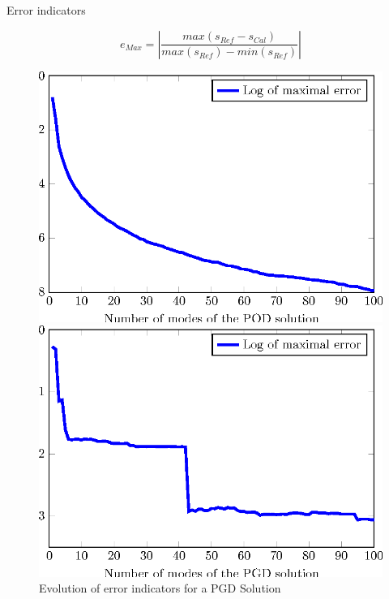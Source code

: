 \documentclass[10pt,a4paper]{beamer}
\begin{document}
\begin{frame}{Error indicators}
	
	\begin{equation}
		e_ {Max} = \left|\frac{ max(s_ {Ref} - s_ {Cal}) }
		{max(s_ {Ref}) - min(s_ {Ref})} \right|
	\end{equation}
	
	\begin{figure}
		\begin{minipage}{0.47\linewidth}
			\includegraphics[width=1\linewidth]{Calcul100M.POD.tikz.eps}
			\caption{\centering Evolution of error indicators for a POD Solution}		
		\end{minipage}
		 \hspace{0.5cm}
		\begin{minipage}{0.47\linewidth}
			\includegraphics[width=1\linewidth]{Calcul100M.PGD.tikz.eps}
			\caption{\centering Evolution of error indicators for a PGD Solution}		
		\end{minipage}
	\end{figure}
	
\end{frame}
\end{document}
